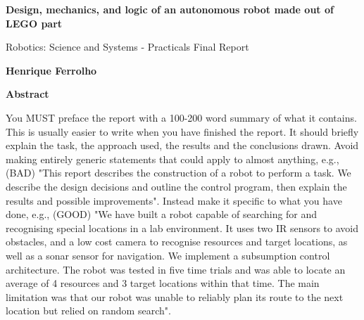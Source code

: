 \thispagestyle{plain}

\begin{center}
    \Large
    \textbf{Design, mechanics, and logic of an autonomous robot made out of LEGO part}

    \vspace{0.4cm}
    \large
    Robotics: Science and Systems - Practicals Final Report

    \vspace{0.4cm}
    \textbf{Henrique Ferrolho}

    \vspace{0.9cm}
    \textbf{Abstract}
\end{center}

You MUST preface the report with a 100-200 word summary of what it contains. This is usually easier to write when you have finished the report. It should briefly explain the task, the approach used, the results and the conclusions drawn. Avoid making entirely generic statements that could apply to almost anything, e.g., (BAD) "This report describes the construction of a robot to perform a task. We describe the design decisions and outline the control program, then explain the results and possible improvements". Instead make it specific to what you have done, e.g., (GOOD) "We have built a robot capable of searching for and recognising special locations in a lab environment. It uses two IR sensors to avoid obstacles, and a low cost camera to recognise resources and target locations, as well as a sonar sensor for navigation. We implement a subsumption control architecture. The robot was tested in five time trials and was able to locate an average of 4 resources and 3 target locations within that time. The main limitation was that our robot was unable to reliably plan its route to the next location but relied on random search".

\newpage
